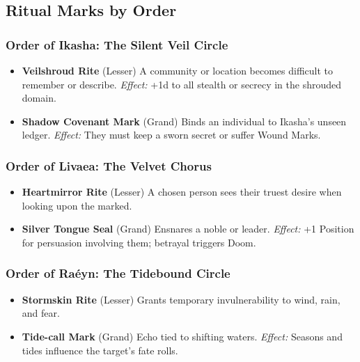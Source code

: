 \documentclass[11pt]{book}
\begin{document}
\subsection*{Ritual Marks by Order}

\subsubsection*{Order of Ikasha: The Silent Veil Circle}

\begin{itemize}[leftmargin=1.5em]
    \item \textbf{Veilshroud Rite} (Lesser)  
    A community or location becomes difficult to remember or describe.  
    \emph{Effect:} +1d to all stealth or secrecy in the shrouded domain.

    \item \textbf{Shadow Covenant Mark} (Grand)  
    Binds an individual to Ikasha's unseen ledger.  
    \emph{Effect:} They must keep a sworn secret or suffer Wound Marks.
\end{itemize}

\subsubsection*{Order of Livaea: The Velvet Chorus}

\begin{itemize}[leftmargin=1.5em]
    \item \textbf{Heartmirror Rite} (Lesser)  
    A chosen person sees their truest desire when looking upon the marked.

    \item \textbf{Silver Tongue Seal} (Grand)  
    Ensnares a noble or leader.  
    \emph{Effect:} +1 Position for persuasion involving them; betrayal triggers Doom.
\end{itemize}

\subsubsection*{Order of Raéyn: The Tidebound Circle}

\begin{itemize}[leftmargin=1.5em]
    \item \textbf{Stormskin Rite} (Lesser)  
    Grants temporary invulnerability to wind, rain, and fear.

    \item \textbf{Tide-call Mark} (Grand)  
    Echo tied to shifting waters.  
    \emph{Effect:} Seasons and tides influence the target's fate rolls.
\end{itemize}
\end{document}
